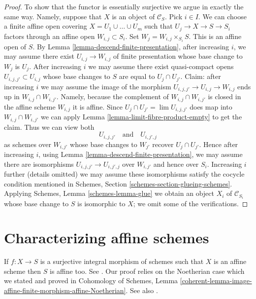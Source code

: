 \begin{proof}
\medskip\noindent
To show that the functor is essentially surjective we argue in
exactly the same way. Namely, suppose that
$X$ is an object of $\mathcal{C}_S$. Pick $i \in I$.
We can choose a finite affine open covering
$X = U_1 \cup \ldots \cup U_m$ such that $U_j \to X \to S \to S_i$
factors through an affine open $W_{i, j} \subset S_i$.
Set $W_j = W_{i, j} \times_{S_i} S$. This is an affine open of $S$.
By Lemma \ref{lemma-descend-finite-presentation},
after increasing $i$, we may assume there exist
$U_{i, j} \to W_{i, j}$ of finite presentation
whose base change to $W_j$ is $U_j$.
After increasing $i$ we may assume there exist
quasi-compact opens $U_{i, j, j'} \subset U_{i, j}$
whose base changes to $S$ are equal to $U_j \cap U_{j'}$.
Claim: after increasing $i$ we may assume the image of the morphism
$U_{i, j, j'} \to U_{i, j} \to W_{i, j}$
ends up in $W_{i, j} \cap W_{i, j'}$.
Namely, because the complement of $W_{i, j} \cap W_{i, j'}$
is closed in the affine scheme $W_{i, j}$ it is affine.
Since $U_j \cap U_{j'} = \lim U_{i, j, j'}$ does map into
$W_{i, j} \cap W_{i, j'}$
we can apply Lemma \ref{lemma-limit-fibre-product-empty}
to get the claim. Thus we can view both
$$
U_{i, j, j'} \quad\text{and}\quad U_{i, j', j}
$$
as schemes over $W_{i, j'}$ whose base changes to $W_{j'}$
recover $U_j \cap U_{j'}$. Hence after increasing $i$, using
Lemma \ref{lemma-descend-finite-presentation},
we may assume there are isomorphisms
$U_{i, j, j'} \to U_{i, j', j}$ over $W_{i, j'}$ and hence
over $S_i$. Increasing $i$ further (details omitted)
we may assume these isomorphisms
satisfy the cocycle condition mentioned in
Schemes, Section \ref{schemes-section-glueing-schemes}.
Applying Schemes, Lemma \ref{schemes-lemma-glue}
we obtain an object $X_i$ of $\mathcal{C}_{S_i}$ whose
base change to $S$ is isomorphic to $X$; we omit some
of the verifications.
\end{proof}












\section{Characterizing affine schemes}
\label{section-affine}

\noindent
If $f : X \to S$ is a surjective integral morphism of schemes
such that $X$ is an affine scheme then $S$ is affine too.
See \cite[A.2]{Conrad-Nagata}. Our proof relies
on the Noetherian case which we stated and proved in Cohomology of Schemes,
Lemma \ref{coherent-lemma-image-affine-finite-morphism-affine-Noetherian}.
See also \cite[II 6.7.1]{EGA}.

